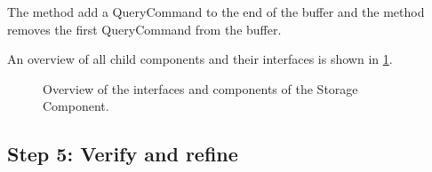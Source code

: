 \npar The method  add a QueryCommand to the end
of the buffer and the method  removes the first
QueryCommand from the buffer.

\npar An overview of all child components and their interfaces is shown in
\ref{fig:it4/interfaces}.

\begin{figure}[H]
	\begin{centering}
		\caption{Overview of the interfaces and components of the Storage Component.}
		\label{fig:it4/interfaces}
	\end{centering}
\end{figure}

\subsection{Step 5: Verify and refine}
\label{add:it4/verification}

